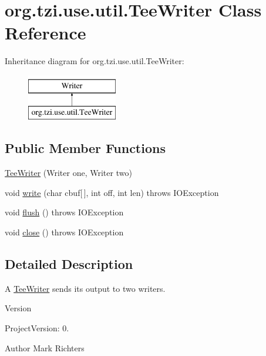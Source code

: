 \hypertarget{classorg_1_1tzi_1_1use_1_1util_1_1_tee_writer}{\section{org.\-tzi.\-use.\-util.\-Tee\-Writer Class Reference}
\label{classorg_1_1tzi_1_1use_1_1util_1_1_tee_writer}
}
Inheritance diagram for org.\-tzi.\-use.\-util.\-Tee\-Writer\-:\begin{figure}[H]
\begin{center}
\leavevmode
\includegraphics[height=2.000000cm]{classorg_1_1tzi_1_1use_1_1util_1_1_tee_writer}
\end{center}
\end{figure}
\subsection*{Public Member Functions}
\begin{DoxyCompactItemize}
\item 
\hyperlink{classorg_1_1tzi_1_1use_1_1util_1_1_tee_writer_a120540ae36c3f220ee4ef58d65b92031}{Tee\-Writer} (Writer one, Writer two)
\item 
void \hyperlink{classorg_1_1tzi_1_1use_1_1util_1_1_tee_writer_a3bec50db2047e6877e2098303b18ef3a}{write} (char cbuf\mbox{[}$\,$\mbox{]}, int off, int len)  throws I\-O\-Exception 
\item 
void \hyperlink{classorg_1_1tzi_1_1use_1_1util_1_1_tee_writer_a3804f761fb957bd5a20915581d7f1f74}{flush} ()  throws I\-O\-Exception 
\item 
void \hyperlink{classorg_1_1tzi_1_1use_1_1util_1_1_tee_writer_a66683615e0fafa13567c65f79a198295}{close} ()  throws I\-O\-Exception 
\end{DoxyCompactItemize}


\subsection{Detailed Description}
A \hyperlink{classorg_1_1tzi_1_1use_1_1util_1_1_tee_writer}{Tee\-Writer} sends its output to two writers.

\begin{DoxyVersion}{Version}

\end{DoxyVersion}
\begin{DoxyParagraph}{Project\-Version\-:}
0. 
\end{DoxyParagraph}
\begin{DoxyAuthor}{Author}
Mark Richters 
\end{DoxyAuthor}


